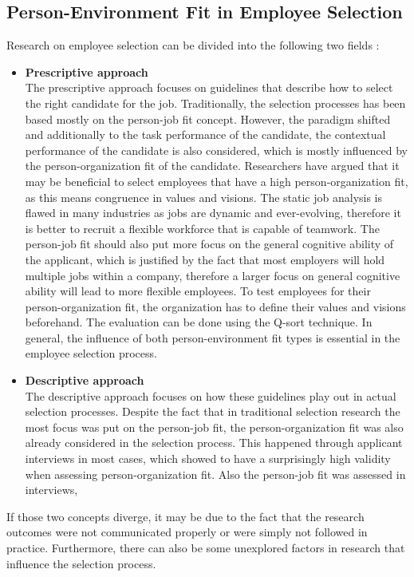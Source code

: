 \documentclass[draft,final]{thesisclass} %
\begin{document}
\subsection{Person-Environment Fit in Employee Selection}
Research on employee selection can be divided into the following two fields \parencite[185-186]{po_and_pj_fit_literature_review}:
\begin{itemize}
    \item \textbf{Prescriptive approach}\\
    The prescriptive approach focuses on guidelines that describe how to select the right candidate for the job.
    Traditionally, the selection processes has been based mostly on the person-job fit concept.
    However, the paradigm shifted and additionally to the task performance of the candidate, the contextual performance of the candidate is also considered, which is mostly influenced by the person-organization fit of the candidate.
    Researchers have argued that it may be beneficial to select employees that have a high person-organization fit, as this means congruence in values and visions.
    The static job analysis is flawed in many industries as jobs are dynamic and ever-evolving, therefore it is better to recruit a flexible workforce that is capable of teamwork.
    The person-job fit should also put more focus on the general cognitive ability of the applicant, which is justified by the fact that most employers will hold multiple jobs within a company, therefore a larger focus on general cognitive ability will lead to more flexible employees.
    To test employees for their person-organization fit, the organization has to define their values and visions beforehand.
    The evaluation can be done using the Q-sort technique.
    In general, the influence of both person-environment fit types is essential in the employee selection process.
    \item \textbf{Descriptive approach}\\
    The descriptive approach focuses on how these guidelines play out in actual selection processes.
    Despite the fact that in traditional selection research the most focus was put on the person-job fit, the person-organization fit was also already considered in the selection process.
    This happened through applicant interviews in most cases, which showed to have a surprisingly high validity when assessing person-organization fit.
    Also the person-job fit was assessed in interviews, 
\end{itemize}
If those two concepts diverge, it may be due to the fact that the research outcomes were not communicated properly or were simply not followed in practice.
Furthermore, there can also be some unexplored factors in research that influence the selection process.
\end{document}
